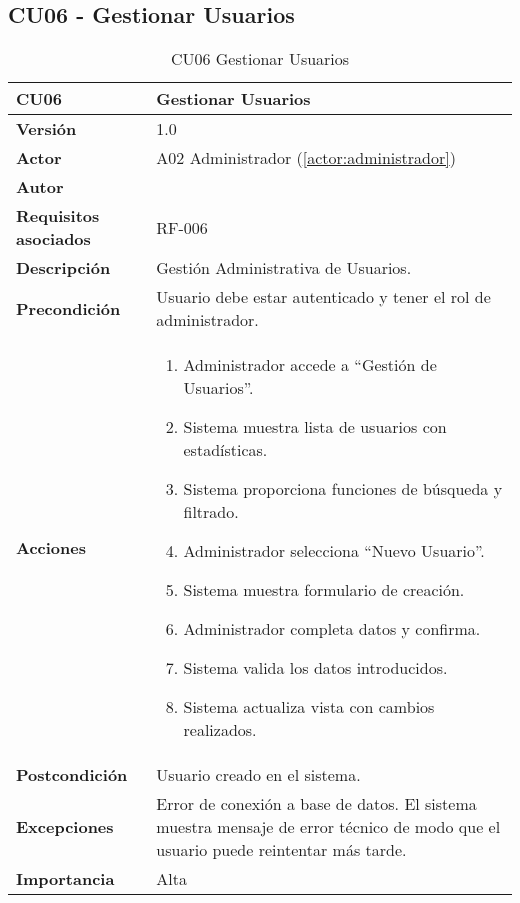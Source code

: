 \subsection{CU06 - Gestionar Usuarios}

\begin{table}[H]
	\centering
	\begin{tabularx}{\linewidth}{ p{} p{} }
		\toprule
		\textbf{CU06}    & \textbf{Gestionar Usuarios} \\
		\toprule
		\textbf{Versión}              & 1.0    \\
		\textbf{Actor}                & A02 Administrador (\ref{actor:administrador}) \\
		\textbf{Autor}                & \nombre \\
		\textbf{Requisitos asociados} & RF-006 \\
		\textbf{Descripción}          & Gestión Administrativa de Usuarios. \\
		\textbf{Precondición}         & Usuario debe estar autenticado y tener el rol de administrador. \\
		\textbf{Acciones}             &
		\begin{enumerate}
			\def\labelenumi{\arabic{enumi}.}
			\tightlist
			\item Administrador accede a ``Gestión de Usuarios''.
            \item Sistema muestra lista de usuarios con estadísticas.
            \item Sistema proporciona funciones de búsqueda y filtrado.
            \item Administrador selecciona ``Nuevo Usuario''.
 	    \item Sistema muestra formulario de creación.
            \item Administrador completa datos y confirma.
            \item Sistema valida los datos introducidos.
            \item Sistema actualiza vista con cambios realizados.
		\end{enumerate}\\
		\textbf{Postcondición}        & Usuario creado en el sistema.\\
		\textbf{Excepciones}          & Error de conexión a base de datos. El sistema muestra mensaje de error técnico de modo que el usuario puede reintentar más tarde.\\
		\textbf{Importancia}          & Alta \\
		\bottomrule
	\end{tabularx}
	\caption{CU06 Gestionar Usuarios}
	\label{cu:gestionar-usuarios}
\end{table}

